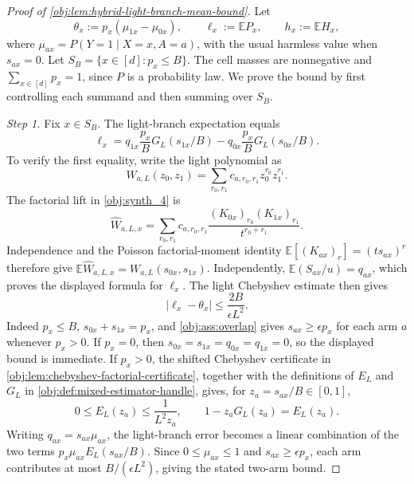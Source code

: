 \begin{proof}[Proof of \cref{obj:lem:hybrid-light-branch-mean-bound}]
Let
\[
\theta_x:=p_x(\mu_{1x}-\mu_{0x}),\qquad
\ell_x:=\mathbb E P_x,\qquad
h_x:=\mathbb E H_x,
\]
where \(\mu_{ax}=P(Y=1\mid X=x,A=a)\), with the usual harmless value when
\(s_{ax}=0\). Let \(S_B=\{x\in[d]:p_x\le B\}\). The cell masses are nonnegative and
\(\sum_{x\in[d]}p_x=1\), since \(P\) is a probability law. We prove the bound by first controlling
each summand and then summing over \(S_B\). %

\emph{Step 1.} Fix \(x\in S_B\). The light-branch expectation equals
\[
\ell_x
=
q_{1x}\frac{p_x}{B}G_L(s_{1x}/B)
-
q_{0x}\frac{p_x}{B}G_L(s_{0x}/B).
\]
To verify the first equality, write the light polynomial as
\[
W_{a,L}(z_0,z_1)=\sum_{r_0,r_1}c_{a,r_0,r_1}z_0^{r_0}z_1^{r_1}.
\]
The factorial lift in \cref{obj:synth_4} is
\[
\widehat W_{a,L,x}
=\sum_{r_0,r_1}c_{a,r_0,r_1}
\frac{(K_{0x})_{r_0}(K_{1x})_{r_1}}{t^{r_0+r_1}}.
\]
Independence and the Poisson factorial-moment identity
\(\mathbb E[(K_{ax})_r]=(ts_{ax})^r\) therefore give
\(\mathbb E\widehat W_{a,L,x}=W_{a,L}(s_{0x},s_{1x})\).  Independently,
\(\mathbb E(S_{ax}/u)=q_{ax}\), which proves the displayed formula for \(\ell_x\).
The light Chebyshev estimate then gives
\[
|\ell_x-\theta_x|
\le
\frac{2B}{\epsilon L^2}.
\]
Indeed \(p_x\le B\), \(s_{0x}+s_{1x}=p_x\), and \cref{obj:ass:overlap} gives
\(s_{ax}\ge \epsilon p_x\) for each arm \(a\) whenever \(p_x>0\). If \(p_x=0\),
then \(s_{0x}=s_{1x}=q_{0x}=q_{1x}=0\), so the displayed bound is immediate. If \(p_x>0\), the
shifted Chebyshev certificate in \cref{obj:lem:chebyshev-factorial-certificate}, together with the
definitions of \(E_L\) and \(G_L\) in \cref{obj:def:mixed-estimator-handle}, gives, for
\(z_a=s_{ax}/B\in[0,1]\),
\[
0\le E_L(z_a)\le \frac{1}{L^2z_a},
\qquad
1-z_aG_L(z_a)=E_L(z_a).
\]
Writing \(q_{ax}=s_{ax}\mu_{ax}\), the light-branch error becomes a linear combination of the two
terms \(p_x\mu_{ax}E_L(s_{ax}/B)\). Since \(0\le\mu_{ax}\le1\) and
\(s_{ax}\ge\epsilon p_x\), each arm contributes at most \(B/(\epsilon L^2)\), giving the stated
two-arm bound. %


\end{proof}

